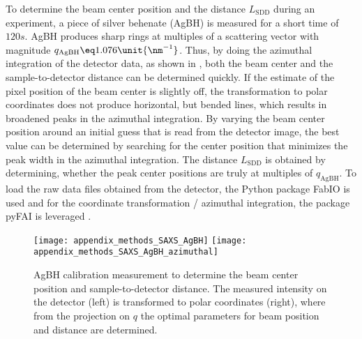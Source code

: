 \documentclass[\main/dresen_thesis.tex]{subfiles}
\begin{document}
    To determine the beam center position and the distance $L_\mathrm{SDD}$ during an experiment, a piece of silver behenate (AgBH) is measured for a short time of $120 \unit{s}$.
    AgBH produces sharp rings at multiples of a scattering vector with magnitude $q_\mathrm{AgBH} \eq 1.076 \unit{\nm^{-1}}$.
    Thus, by doing the azimuthal integration of the detector data, as shown in , both the beam center and the sample-to-detector distance can be determined quickly.
    If the estimate of the pixel position of the beam center is slightly off, the transformation to polar coordinates does not produce horizontal, but bended lines, which results in broadened peaks in the azimuthal integration.
    By varying the beam center position around an initial guess that is read from the detector image, the best value can be determined by searching for the center position that minimizes the peak width in the azimuthal integration.
    The distance $L_\mathrm{SDD}$ is obtained by determining, whether the peak center positions are truly at multiples of $q_\mathrm{AgBH}$.
    To load the raw data files obtained from the detector, the Python package FabIO \cite{Knudsen_2013_Fabio} is used and for the coordinate transformation / azimuthal integration, the package pyFAI is leveraged \cite{Ashiotis_2015_Thefa}.
    \begin{figure}[tb]
      \centering
      \texttt{[image: appendix\_methods\_SAXS\_AgBH]}
      \texttt{[image: appendix\_methods\_SAXS\_AgBH\_azimuthal]}
      \caption{\label{fig:appendix:methods:saxs:agBH}AgBH calibration measurement to determine the beam center position and sample-to-detector distance. The measured intensity on the detector (left) is transformed to polar coordinates (right), where from the projection on $q$ the optimal parameters for beam position and distance are determined.}
    \end{figure}
\end{document}
